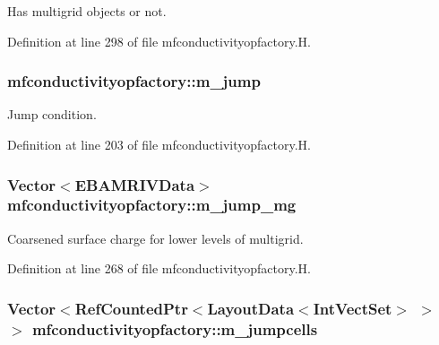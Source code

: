 Has multigrid objects or not. 



Definition at line 298 of file mfconductivityopfactory.\+H.

\subsubsection[{\texorpdfstring{m\+\_\+jump}{m_jump}}]{ mfconductivityopfactory\+::m\+\_\+jump\hspace{0.3cm}{\ttfamily [protected]}}\hypertarget{classmfconductivityopfactory_a2c4713a89d5bfb2cbc15b27d08e7d1a5}{}\label{classmfconductivityopfactory_a2c4713a89d5bfb2cbc15b27d08e7d1a5}


Jump condition. 



Definition at line 203 of file mfconductivityopfactory.\+H.

\subsubsection[{\texorpdfstring{m\+\_\+jump\+\_\+mg}{m_jump_mg}}]{\setlength{\rightskip}{0pt plus 5cm}Vector$<${\bf E\+B\+A\+M\+R\+I\+V\+Data}$>$ mfconductivityopfactory\+::m\+\_\+jump\+\_\+mg\hspace{0.3cm}{\ttfamily [protected]}}\hypertarget{classmfconductivityopfactory_a3004c914d772c7b76fa6a7d6040ab010}{}\label{classmfconductivityopfactory_a3004c914d772c7b76fa6a7d6040ab010}


Coarsened surface charge for lower levels of multigrid. 



Definition at line 268 of file mfconductivityopfactory.\+H.

\subsubsection[{\texorpdfstring{m\+\_\+jumpcells}{m_jumpcells}}]{\setlength{\rightskip}{0pt plus 5cm}Vector$<$Ref\+Counted\+Ptr$<$Layout\+Data$<$Int\+Vect\+Set$>$ $>$ $>$ mfconductivityopfactory\+::m\+\_\+jumpcells\hspace{0.3cm}{\ttfamily [protected]}}\hypertarget{classmfconductivityopfactory_a054fc41f659ad1563a369258f4036a92}{}\label{classmfconductivityopfactory_a054fc41f659ad1563a369258f4036a92}


